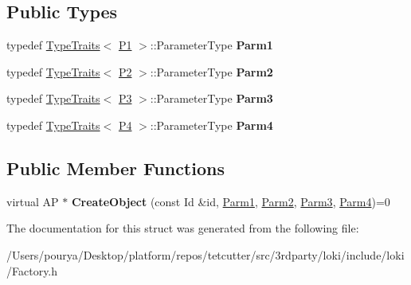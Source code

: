 \subsection*{Public Types}
\begin{DoxyCompactItemize}
\item 
\hypertarget{structLoki_1_1FactoryImpl_3_01AP_00_01Id_00_01Seq_3_01P1_00_01P2_00_01P3_00_01P4_01_4_01_4_a3f0eba2a36138682d8ed266edf9ae2ec}{}typedef \hyperlink{classLoki_1_1TypeTraits}{Type\+Traits}$<$ \hyperlink{structP1}{P1} $>$\+::Parameter\+Type {\bfseries Parm1}\label{structLoki_1_1FactoryImpl_3_01AP_00_01Id_00_01Seq_3_01P1_00_01P2_00_01P3_00_01P4_01_4_01_4_a3f0eba2a36138682d8ed266edf9ae2ec}

\item 
\hypertarget{structLoki_1_1FactoryImpl_3_01AP_00_01Id_00_01Seq_3_01P1_00_01P2_00_01P3_00_01P4_01_4_01_4_af6e3a56f5d9d99f0c8eaa25c5496633d}{}typedef \hyperlink{classLoki_1_1TypeTraits}{Type\+Traits}$<$ \hyperlink{structP2}{P2} $>$\+::Parameter\+Type {\bfseries Parm2}\label{structLoki_1_1FactoryImpl_3_01AP_00_01Id_00_01Seq_3_01P1_00_01P2_00_01P3_00_01P4_01_4_01_4_af6e3a56f5d9d99f0c8eaa25c5496633d}

\item 
\hypertarget{structLoki_1_1FactoryImpl_3_01AP_00_01Id_00_01Seq_3_01P1_00_01P2_00_01P3_00_01P4_01_4_01_4_a0b01cb6a47931f3b66b54149bb941871}{}typedef \hyperlink{classLoki_1_1TypeTraits}{Type\+Traits}$<$ \hyperlink{structP3}{P3} $>$\+::Parameter\+Type {\bfseries Parm3}\label{structLoki_1_1FactoryImpl_3_01AP_00_01Id_00_01Seq_3_01P1_00_01P2_00_01P3_00_01P4_01_4_01_4_a0b01cb6a47931f3b66b54149bb941871}

\item 
\hypertarget{structLoki_1_1FactoryImpl_3_01AP_00_01Id_00_01Seq_3_01P1_00_01P2_00_01P3_00_01P4_01_4_01_4_a9661b0fc732c15fcd632ec1967643798}{}typedef \hyperlink{classLoki_1_1TypeTraits}{Type\+Traits}$<$ \hyperlink{structP4}{P4} $>$\+::Parameter\+Type {\bfseries Parm4}\label{structLoki_1_1FactoryImpl_3_01AP_00_01Id_00_01Seq_3_01P1_00_01P2_00_01P3_00_01P4_01_4_01_4_a9661b0fc732c15fcd632ec1967643798}

\end{DoxyCompactItemize}
\subsection*{Public Member Functions}
\begin{DoxyCompactItemize}
\item 
\hypertarget{structLoki_1_1FactoryImpl_3_01AP_00_01Id_00_01Seq_3_01P1_00_01P2_00_01P3_00_01P4_01_4_01_4_a8f630c1a683e92bdec82af9a76fde669}{}virtual A\+P $\ast$ {\bfseries Create\+Object} (const Id \&id, \hyperlink{classLoki_1_1EmptyType}{Parm1}, \hyperlink{classLoki_1_1EmptyType}{Parm2}, \hyperlink{classLoki_1_1EmptyType}{Parm3}, \hyperlink{classLoki_1_1EmptyType}{Parm4})=0\label{structLoki_1_1FactoryImpl_3_01AP_00_01Id_00_01Seq_3_01P1_00_01P2_00_01P3_00_01P4_01_4_01_4_a8f630c1a683e92bdec82af9a76fde669}

\end{DoxyCompactItemize}


The documentation for this struct was generated from the following file\+:\begin{DoxyCompactItemize}
\item 
/\+Users/pourya/\+Desktop/platform/repos/tetcutter/src/3rdparty/loki/include/loki/Factory.\+h\end{DoxyCompactItemize}
